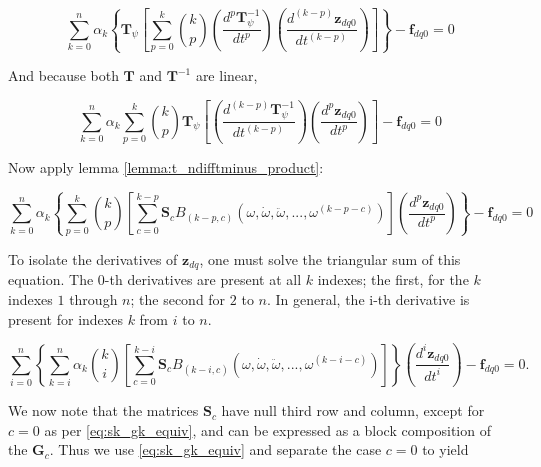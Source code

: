 \begin{equation} \sum\limits_{k=0}^n \alpha_k\left\{\mathbf{T}_\psi\left[ \sum\limits_{p=0}^{k} {k\choose p} \left(\dfrac{d^{p} \mathbf{T}^{-1}_\psi}{dt^p}\right) \left(\dfrac{d^{\left(k-p\right)} \mathbf{z}_{dq0}}{dt^{\left(k-p\right)}}\right) \right]\right\} - \mathbf{f}_{dq0} = 0 \end{equation}

	And because both $\mathbf{T}$ and $\mathbf{T}^{-1}$ are linear,

\begin{equation} \sum\limits_{k=0}^n \alpha_k \sum\limits_{p=0}^{k} {k\choose p} \mathbf{T}_\psi\left[\left(\dfrac{d^{\left(k-p\right)} \mathbf{T}^{-1}_\psi}{dt^{\left(k-p\right)}}\right) \left(\dfrac{d^p \mathbf{z}_{dq0}}{dt^p}\right) \right] - \mathbf{f}_{dq0} = 0 \end{equation}

	Now apply lemma \ref{lemma:t_ndifftminus_product}:

\begin{equation} \sum\limits_{k=0}^n \alpha_k \left\{\sum\limits_{p=0}^{k} {k\choose p} \left[\sum\limits_{c=0}^{k-p} \mathbf{S}_c B_{\left(k-p,c\right)}\left(\omega,\dot{\omega},\ddot{\omega},...,\omega^{(k-p-c)}\right) \right] \left(\dfrac{d^p \mathbf{z}_{dq0}}{dt^p }\right)\right\} - \mathbf{f}_{dq0} = 0 \end{equation}

	To isolate the derivatives of $\mathbf{z}_{dq}$, one must solve the triangular sum of this equation. The 0-th derivatives are present at all $k$ indexes; the first, for the $k$ indexes $1$ through $n$; the second for $2$ to $n$. In general, the i-th derivative is present for indexes $k$ from $i$ to $n$.

\begin{equation} \sum\limits_{i=0}^n \left\{\sum\limits_{k=i}^{n} \alpha_k{k\choose i} \left[\sum\limits_{c=0}^{k-i} \mathbf{S}_c B_{\left(k-i,c\right)}\left(\omega,\dot{\omega},\ddot{\omega},...,\omega^{(k-i-c)}\right) \right]\right\} \left(\dfrac{d^i \mathbf{z}_{dq0}}{dt^i }\right) - \mathbf{f}_{dq0} = 0 . \label{eq:3p_original_ode_complete}\end{equation}

	We now note that the matrices $\mathbf{S}_c$ have null third row and column, except for $c = 0$ as per \eqref{eq:sk_gk_equiv}, and can be expressed as a block composition of the $\mathbf{G}_c$. Thus we use \eqref{eq:sk_gk_equiv} and separate the case $c=0$ to yield

